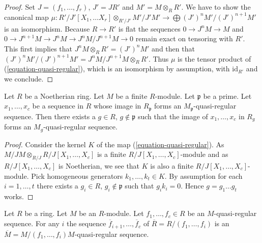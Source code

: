\begin{proof}
Set $J = (f_1, \ldots, f_r)$, $J' = JR'$ and $M' = M \otimes_R R'$.
We have to show the canonical map
$\mu : R'/J'[X_1, \ldots X_r] \otimes_{R'/J'} M'/J'M' \to
\bigoplus (J')^nM'/(J')^{n + 1}M'$ is an isomorphism.
Because $R \to R'$ is flat the sequences
$0 \to J^nM \to M$ and
$0 \to J^{n + 1}M \to J^nM \to J^nM/J^{n + 1}M \to 0$
remain exact on tensoring with $R'$. This first implies that
$J^nM \otimes_R R' = (J')^nM'$ and then that
$(J')^nM'/(J')^{n + 1}M' = J^nM/J^{n + 1}M \otimes_R R'$.
Thus $\mu$ is the tensor product of (\ref{equation-quasi-regular}),
which is an isomorphism by assumption,
with $\text{id}_{R'}$ and we conclude.
\end{proof}

\begin{lemma}
\label{lemma-quasi-regular-sequence-in-neighbourhood}
Let $R$ be a Noetherian ring. Let $M$ be a finite $R$-module.
Let $\mathfrak p$ be a prime. Let $x_1, \ldots, x_c$ be a sequence
in $R$ whose image in $R_{\mathfrak p}$ forms an
$M_{\mathfrak p}$-quasi-regular sequence. Then there exists a
$g \in R$, $g \not \in \mathfrak p$
such that the image of $x_1, \ldots, x_c$ in $R_g$ forms
an $M_g$-quasi-regular sequence.
\end{lemma}

\begin{proof}
Consider the kernel $K$ of the map (\ref{equation-quasi-regular}).
As $M/JM \otimes_{R/J} R/J[X_1, \ldots, X_c]$ is a finite
$R/J[X_1, \ldots, X_c]$-module and as $R/J[X_1, \ldots, X_c]$ is
Noetherian, we see that $K$ is also a finite $R/J[X_1, \ldots, X_c]$-module.
Pick homogeneous generators $k_1, \ldots, k_t \in K$.
By assumption for each $i = 1, \ldots, t$ there exists a $g_i \in R$,
$g_i \not \in \mathfrak p$ such that $g_i k_i = 0$.
Hence $g = g_1 \ldots g_t$ works.
\end{proof}

\begin{lemma}
\label{lemma-truncate-quasi-regular}
Let $R$ be a ring. Let $M$ be an $R$-module.
Let $f_1, \ldots, f_c \in R$ be an $M$-quasi-regular sequence.
For any $i$ the sequence
$\overline{f}_{i + 1}, \ldots, \overline{f}_c$
of $\overline{R} = R/(f_1, \ldots, f_i)$ is an
$\overline{M} = M/(f_1, \ldots, f_i)M$-quasi-regular sequence.
\end{lemma}

